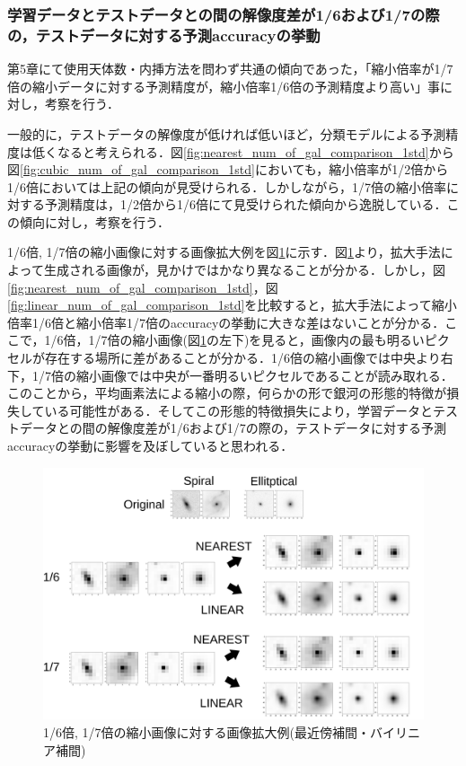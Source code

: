\documentclass[a4j, 11pt]{jreport}
\begin{document}
\subsubsection{学習データとテストデータとの間の解像度差が1/6および1/7の際の，テストデータに対する予測accuracyの挙動}
第5章にて使用天体数・内挿方法を問わず共通の傾向であった，「縮小倍率が1/7倍の縮小データに対する予測精度が，縮小倍率1/6倍の予測精度より高い」事に対し，考察を行う．

一般的に，テストデータの解像度が低ければ低いほど，分類モデルによる予測精度は低くなると考えられる．図\ref{fig:nearest_num_of_gal_comparison_1std}から図\ref{fig:cubic_num_of_gal_comparison_1std}においても，縮小倍率が1/2倍から1/6倍においては上記の傾向が見受けられる．しかしながら，1/7倍の縮小倍率に対する予測精度は，1/2倍から1/6倍にて見受けられた傾向から逸脱している．この傾向に対し，考察を行う．

1/6倍, 1/7倍の縮小画像に対する画像拡大例を図\ref{fig:1_6and1_7}に示す．図\ref{fig:1_6and1_7}より，拡大手法によって生成される画像が，見かけではかなり異なることが分かる．しかし，図\ref{fig:nearest_num_of_gal_comparison_1std}，図\ref{fig:linear_num_of_gal_comparison_1std}を比較すると，拡大手法によって縮小倍率1/6倍と縮小倍率1/7倍のaccuracyの挙動に大きな差はないことが分かる．ここで，1/6倍，1/7倍の縮小画像(図\ref{fig:1_6and1_7}の左下)を見ると，画像内の最も明るいピクセルが存在する場所に差があることが分かる．1/6倍の縮小画像では中央より右下，1/7倍の縮小画像では中央が一番明るいピクセルであることが読み取れる．このことから，平均画素法による縮小の際，何らかの形で銀河の形態的特徴が損失している可能性がある．そしてこの形態的特徴損失により，学習データとテストデータとの間の解像度差が1/6および1/7の際の，テストデータに対する予測accuracyの挙動に影響を及ぼしていると思われる．

\begin{figure}[htbp]
 \centering
 \includegraphics[width=1.0\hsize, keepaspectratio]{images/5syou/syuron_5syou_kakudai/ver1/5syou_giron_1_6and1_7.png}
 \caption{1/6倍, 1/7倍の縮小画像に対する画像拡大例(最近傍補間・バイリニア補間)}
 \label{fig:1_6and1_7}
\end{figure}
\end{document}
